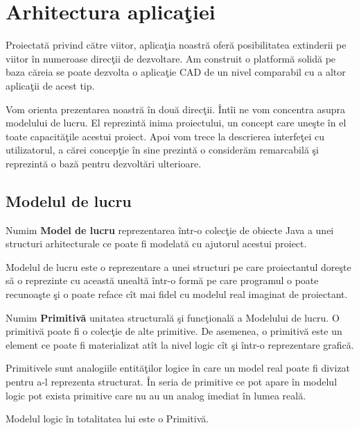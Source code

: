 \chapter{Arhitectura aplicaţiei}

Proiectată privind către viitor, aplicaţia noastră oferă posibilitatea 
extinderii pe viitor în numeroase direcţii de dezvoltare. Am construit o 
platformă solidă pe baza căreia se poate dezvolta o aplicaţie CAD de un nivel 
comparabil cu a altor aplicaţii de acest tip.

Vom orienta prezentarea noastră în două direcţii. Întîi ne vom concentra asupra 
modelului de lucru. El reprezintă inima proiectului, un concept care uneşte în 
el toate capacităţile acestui proiect. Apoi vom trece la descrierea interfeţei 
cu utilizatorul, a cărei concepţie în sine prezintă o considerăm remarcabilă şi 
reprezintă o bază pentru dezvoltări ulterioare.

\section{Modelul de lucru}

\begin{definition}
\label{define:model}
Numim \textbf{Model de lucru} reprezentarea într-o colecţie de obiecte Java a 
unei structuri arhitecturale ce poate fi modelată cu ajutorul acestui 
proiect.
\end{definition}

Modelul de lucru este o reprezentare a unei structuri pe care proiectantul 
doreşte să o reprezinte cu această unealtă într-o formă pe care programul o 
poate recunoaşte şi o poate reface cît mai fidel cu modelul real imaginat de 
proiectant.

\begin{definition}
\label{define:primitive}
Numim \textbf{Primitivă} unitatea structurală şi funcţională a Modelului de 
lucru. O primitivă poate fi o colecţie de alte primitive. De asemenea, o 
primitivă este un element ce poate fi materializat atît la nivel logic cît şi 
într-o reprezentare grafică.
\end{definition}

Primitivele sunt analogiile entităţilor logice în care un model real poate fi 
divizat pentru a-l reprezenta structurat. În seria de primitive ce pot apare în 
modelul logic pot exista primitive care nu au un analog imediat în lumea reală.

\begin{statement}
Modelul logic în totalitatea lui este o Primitivă.
\end{statement}

